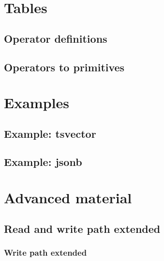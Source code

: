 \documentclass[11pt]{article}
\begin{document}
\newpage
\hypertarget{tables}{%
\section{Tables}\label{tables}}

\hypertarget{operator-definitions}{%
\subsection{Operator definitions}\label{operator-definitions}}


\hypertarget{operators-to-primitives}{%
\subsection{Operators to primitives}\label{operators-to-primitives}}


\newpage
\hypertarget{examples}{%
\section{Examples}\label{examples}}

\hypertarget{example-tsvector}{%
\subsection{Example: tsvector}\label{example-tsvector}}


\hypertarget{example-jsonb}{%
\subsection{Example: jsonb}\label{example-jsonb}}


\newpage
\hypertarget{advanced-material}{%
\section{Advanced material}\label{advanced-material}}


\hypertarget{read-and-write-path-extended}{%
\subsection{Read and write path extended}\label{read-and-write-path-extended}}

\hypertarget{write-path-extended}{%
\subsubsection{Write path extended}\label{write-path-extended}}

\end{document}

